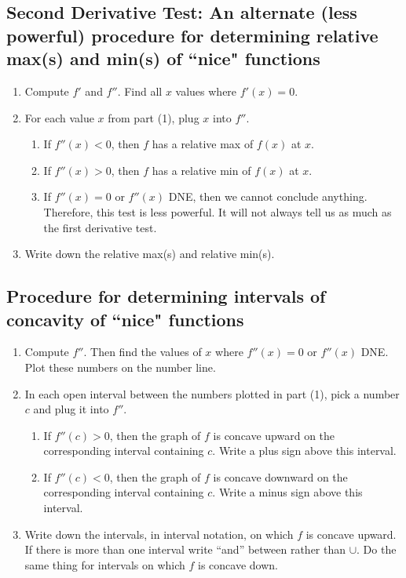 \documentclass[reqno,psamsfonts]{amsart}
\theoremstyle{definition}
\theoremstyle{remark}
\numberwithin{equation}{section}
\begin{document}
\subsection*{Second Derivative Test: An alternate (less powerful) procedure for determining relative max(s) and min(s) of ``nice" functions}
\begin{enumerate}
\item Compute $f'$ and $f''$. Find all $x$ values where $f'(x) = 0$.
\\
\item For each value $x$ from part (1), plug $x$ into $f''$. 
\begin{enumerate}
\item If $f''(x)<0$, then $f$ has a relative max of $f(x)$ at $x$.\\
\item If $f''(x)>0$, then $f$ has a relative min of $f(x)$ at $x$.\\
\item If $f''(x) = 0$ or $f''(x)$ DNE, then we cannot conclude anything. Therefore, this test is less powerful. It will not always tell us as much as the first derivative test. 
\\
\end{enumerate}
\item Write down the relative max(s) and relative min(s). 
\end{enumerate}
\newpage


\subsection*{Procedure for determining intervals of concavity of ``nice" functions}
\begin{enumerate}
\item Compute $f''$. Then find the values of $x$ where $f''(x) = 0$ or $f''(x)$ DNE. Plot these numbers on the number line. 
\\
\item In each open interval between the numbers plotted in part (1), pick a number $c$ and plug it into $f''$. 
\begin{enumerate}
\item If $f''(c)>0$, then the graph of $f$ is concave upward on the corresponding interval containing $c$. Write a plus sign above this interval.
\item If $f''(c)<0$, then the graph of $f$ is concave downward on the corresponding interval containing $c$. Write a minus sign above this interval.
\\
\end{enumerate}
\item Write down the intervals, in interval notation, on which $f$ is concave upward. If there is more than one interval write ``and'' between rather than $\cup$. Do the same thing for intervals on which $f$ is concave down. 
\end{enumerate}
\vspace{2em}
\end{document}
